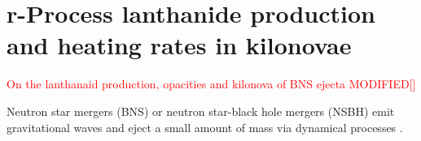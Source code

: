 \documentclass[11pt,a4paper,headinclude=true,DIV=14,BCOR=8mm,chapterprefix,listof=totoc,twoside,openright,abstracton]{scrbook}
\newcommand{\red}[1]{\textcolor{red}{#1}}
\newcommand{\gray}[1]{\textcolor{gray}{#1}}
\begin{document}


\section{r-Process lanthanide production and heating rates in kilonovae}
\red{On the lanthanaid production, opacities and kilonova of BNS ejecta MODIFIED[]}

Neutron star mergers (BNS) or neutron star-black hole mergers (NSBH) emit gravitational waves \cite{TheLIGOScientific:2014jea} and eject a small amount of mass via dynamical processes \cite{Lattimer:1977}. 


\end{document}

